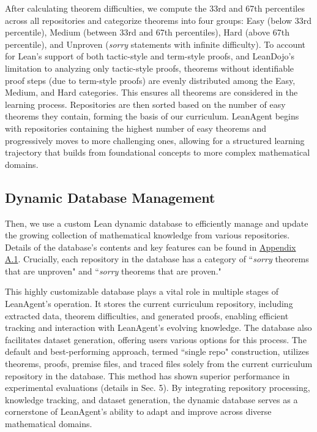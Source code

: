 \documentclass{article} %
\begin{document}
After calculating theorem difficulties, we compute the 33rd and 67th percentiles across all repositories and categorize theorems into four groups: Easy (below 33rd percentile), Medium (between 33rd and 67th percentiles), Hard (above 67th percentile), and Unproven (\textit{sorry} statements with infinite difficulty). To account for Lean's support of both tactic-style and term-style proofs, and LeanDojo's limitation to analyzing only tactic-style proofs, theorems without identifiable proof steps (due to term-style proofs) are evenly distributed among the Easy, Medium, and Hard categories. This ensures all theorems are considered in the learning process. Repositories are then sorted based on the number of easy theorems they contain, forming the basis of our curriculum. LeanAgent begins with repositories containing the highest number of easy theorems and progressively moves to more challenging ones, allowing for a structured learning trajectory that builds from foundational concepts to more complex mathematical domains.

\vspace{-3mm}
\subsection{Dynamic Database Management}

Then, we use a custom Lean dynamic database to efficiently manage and update the growing collection of mathematical knowledge from various repositories. Details of the database's contents and key features can be found in \hyperref[sec:implementation_details]{Appendix A.1}. Crucially, each repository in the database has a category of ``\textit{sorry} theorems that are unproven" and ``\textit{sorry} theorems that are proven."

This highly customizable database plays a vital role in multiple stages of LeanAgent's operation. It stores the current curriculum repository, including extracted data, theorem difficulties, and generated proofs, enabling efficient tracking and interaction with LeanAgent's evolving knowledge. The database also facilitates dataset generation, offering users various options for this process. The default and best-performing approach, termed ``single repo" construction, utilizes theorems, proofs, premise files, and traced files solely from the current curriculum repository in the database. This method has shown superior performance in experimental evaluations (details in Sec. 5). By integrating repository processing, knowledge tracking, and dataset generation, the dynamic database serves as a cornerstone of LeanAgent's ability to adapt and improve across diverse mathematical domains.
\end{document}
